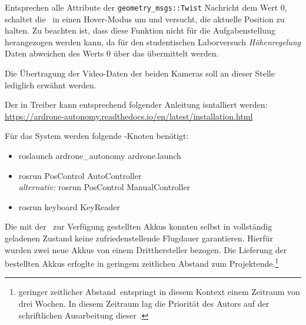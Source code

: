 Entsprechen alle Attribute der \texttt{geometry\_msgs::Twist} Nachricht dem Wert 0, schaltet die \Ar\ in einen Hover-Modus um und versucht, die aktuelle Position zu halten. Zu beachten ist, dass diese Funktion nicht für die Aufgabenstellung herangezogen werden kann, da für den studentischen Laborversuch \textit{Höhenregelung} Daten abweichen des Werts 0 über das  übermittelt werden.


Die Übertragung der Video-Daten der beiden Kameras soll an dieser Stelle lediglich erwähnt werden.




















Der in  Treiber kann entsprechend folgender Anleitung isntalliert werden:\\
\href{https://ardrone-autonomy.readthedocs.io/en/latest/installation.html}{https://ardrone-autonomy.readthedocs.io/en/latest/installation.html}

Für das System werden folgende \ROS-Knoten benötigt:
\begin{itemize}
\item roslaunch ardrone\_autonomy ardrone.launch
\item rosrun PosControl AutoController\\
\textit{alternativ:} rosrun PosControl ManualController
\item rosrun keyboard KeyReader
\end{itemize}



Die mit der \Ar\ zur Verfügung gestellten Akkus konnten selbst in vollständig geladenen Zustand keine zufriedenstellende Flugdauer garantieren. Hierfür wurden zwei neue Akkus von einem Dritthersteller bezogen. Die Lieferung der bestellten Akkus erfoglte in geringem zeitlichen Abstand zum Projektende.\footnote{\glqq geringer zeitlicher Abstand\grqq\ entspringt in diesem Kontext einem Zeitraum von drei Wochen. In diesem Zeitraum lag die Priorität des Autors auf der schriftlichen Ausarbeitung dieser \Arbeit.}




















